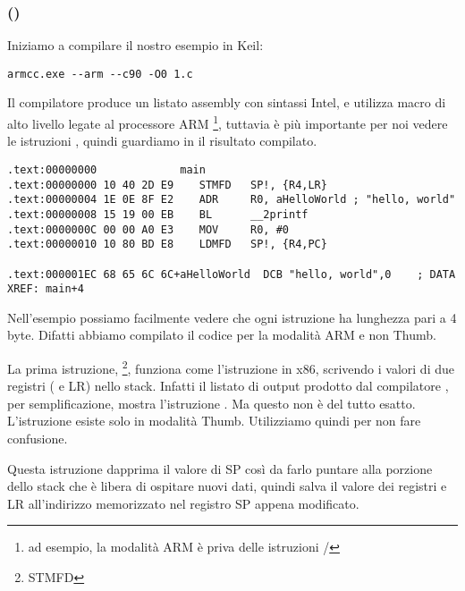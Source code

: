 \subsubsection{\NonOptimizingKeilVI (\ARMMode)}

Iniziamo a compilare il nostro esempio in Keil:

\begin{lstlisting}
armcc.exe --arm --c90 -O0 1.c
\end{lstlisting}

\myindex{\IntelSyntax}
Il compilatore  produce un listato assembly con sintassi Intel,
e utilizza macro di alto livello legate al processore ARM
\footnote{ad esempio, la modalità ARM è priva delle istruzioni \PUSH/\POP},
tuttavia è più importante per noi vedere le istruzioni , quindi guardiamo in \IDA il risultato compilato.

\begin{lstlisting}[caption=\NonOptimizingKeilVI (\ARMMode) \IDA,style=customasmARM]
.text:00000000             main
.text:00000000 10 40 2D E9    STMFD   SP!, {R4,LR}
.text:00000004 1E 0E 8F E2    ADR     R0, aHelloWorld ; "hello, world"
.text:00000008 15 19 00 EB    BL      __2printf
.text:0000000C 00 00 A0 E3    MOV     R0, #0
.text:00000010 10 80 BD E8    LDMFD   SP!, {R4,PC}

.text:000001EC 68 65 6C 6C+aHelloWorld  DCB "hello, world",0    ; DATA XREF: main+4
\end{lstlisting}

Nell'esempio possiamo facilmente vedere che ogni istruzione ha lunghezza pari a 4 byte.
Difatti abbiamo compilato il codice per la modalità ARM e non Thumb.

La prima istruzione, \footnote{\ac{STMFD}},
funziona come l'istruzione \PUSH in x86, scrivendo i valori di due registri ( e \ac{LR}) nello stack.
Infatti il listato di output prodotto dal compilatore , per semplificazione, mostra l'istruzione .
Ma questo non è del tutto esatto. L'istruzione \PUSH esiste solo in modalità Thumb. Utilizziamo quindi \IDA per non fare confusione.

Questa istruzione dapprima  il valore di \ac{SP} così da farlo puntare alla porzione dello stack che è libera di ospitare nuovi dati, quindi salva il valore dei registri  e \ac{LR} all'indirizzo memorizzato nel registro \ac{SP} appena modificato.

